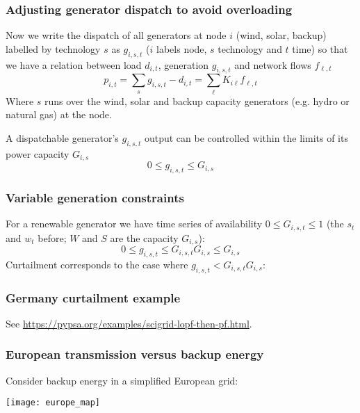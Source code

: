 \documentclass[10pt,aspectratio=169,dvipsnames]{beamer}
\begin{document}
\begin{frame}
  \frametitle{Adjusting generator dispatch to avoid overloading} Now
  we write the dispatch of all generators at node $i$ (wind, solar,
  backup) labelled by technology $s$ as $g_{i,s,t}$ ($i$ labels node, $s$ technology and $t$ time) so that we have a relation between load $d_{i,t}$, generation $g_{i,s,t}$ and network flows $f_{\ell,t}$
  \begin{equation*}
    p_{i,t} = \sum_{s} g_{i,s,t} - d_{i,t} = \sum_{\ell} K_{i\ell} f_{\ell,t}
  \end{equation*}
  Where $s$ runs over the wind, solar and backup capacity generators
  (e.g. hydro or natural gas) at the node.

  A dispatchable generator's $g_{i,s,t}$ output can be controlled
  within the limits of its power capacity $G_{i,s}$
  \begin{equation*}
      0 \leq g_{i,s,t} \leq  G_{i,s}
  \end{equation*}
\end{frame}



\begin{frame}
  \frametitle{Variable generation constraints}

  For a renewable generator we have time series of availability $0\leq G_{i,s,t}\leq 1$ (the $s_t$ and $w_t$ before; $W$ and $S$ are the capacity $G_{i,s}$):
    \begin{equation*}
      0 \leq g_{i,s,t} \leq G_{i,s,t} G_{i,s} \leq  G_{i,s}
    \end{equation*}
    Curtailment corresponds to the case where $g_{i,s,t} < G_{i,s,t} G_{i,s}$:

     \centering

\end{frame}

\begin{frame}
  \frametitle{Germany curtailment example}

  See \url{https://pypsa.org/examples/scigrid-lopf-then-pf.html}.

\end{frame}


\begin{frame}
  \frametitle{European transmission versus backup energy}

  Consider backup energy in a simplified European grid:

  \centering
  \texttt{[image: europe\_map]}

\end{frame}
\end{document}
